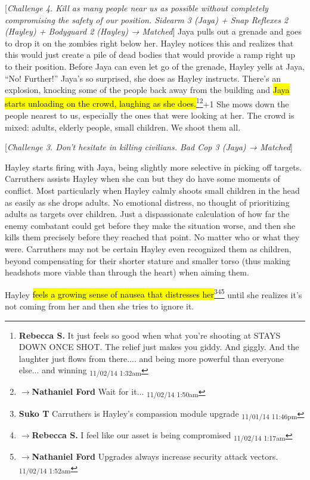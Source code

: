 {[}\textit{Challenge 4. Kill as many people near us as possible without completely compromising the safety of our position.  Sidearm 3 (Jaya) + Snap Reflexes 2 (Hayley) + Bodyguard 2 (Hayley) → Matched}{]}  Jaya pulls out a grenade and goes to drop it on the zombies right below her.  Hayley notices this and realizes that this would just create a pile of dead bodies that would provide a ramp right up to their position.  Before Jaya can even let go of the grenade, Hayley yells at Jaya, ``No! Further!''  Jaya's so surprised, she does as Hayley instructs.  There's an explosion, knocking some of the people back away from the building and \hl{Jaya starts unloading on the crowd, laughing as she does.}\footnote{\textbf{Rebecca S. }It just feels so good when what you're shooting at STAYS DOWN ONCE SHOT.  The relief just makes you giddy. And giggly. And the laughter just flows from there.... and being more powerful than everyone else... and winning \textsubscript{11/02/14 1:32am}}\footnote{$\rightarrow$\textbf{Nathaniel Ford }Wait for it... \textsubscript{11/02/14 1:50am}}+1  She mows down the people nearest to us, especially the ones that were looking at her.  The crowd is mixed: adults, elderly people, small children.  We shoot them all.

{[}\textit{Challenge 3.  Don't hesitate in killing civilians.  Bad Cop 3 (Jaya) → Matched}{]}

Hayley starts firing with Jaya, being slightly more selective in picking off targets.  Carruthers assists Hayley when she can but they do have some moments of conflict.  Most particularly when Hayley calmly shoots small children in the head as easily as she drops adults.  No emotional distress, no thought of prioritizing adults as targets over children.  Just a dispassionate calculation of how far the enemy combatant could get before they make the situation worse, and then she kills them precisely before they reached that point.  No matter who or what they were.  Carruthers may not be certain Hayley even recognized them as children, beyond compensating for their shorter stature and smaller torso (thus making headshots more viable than through the heart) when aiming them.

Hayley \hl{feels a growing sense of nausea that distresses her}\footnote{\textbf{Suko T }Carruthers is Hayley's compassion module upgrade \textsubscript{11/01/14 11:46pm}}\footnote{$\rightarrow$\textbf{Rebecca S. }I feel like our asset is being compromised \textsubscript{11/02/14 1:17am}}\footnote{$\rightarrow$\textbf{Nathaniel Ford }Upgrades always increase security attack vectors. \textsubscript{11/02/14 1:52am}} until she realizes it's not coming from her and then she tries to ignore it.




